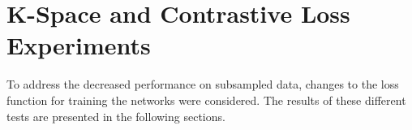 \documentclass[english,version-2022-01]{uzl-thesis} %
\begin{document}




\section{K-Space and Contrastive Loss Experiments}
To address the decreased performance on subsampled data, changes to the loss function for training the networks were considered. The results of these different tests are presented in the following sections.
\end{document}
